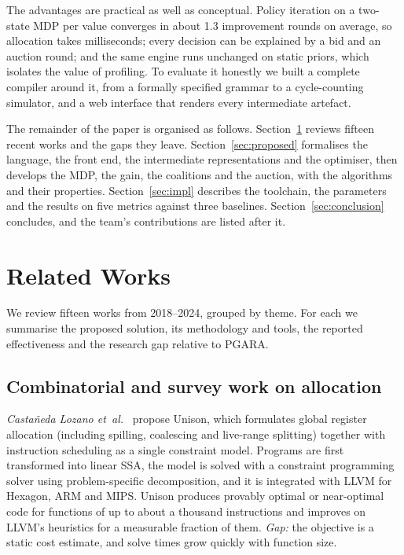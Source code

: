 \documentclass[conference]{IEEEtran}
\newcommand{\MG}{PGARA}
\begin{document}
The advantages are practical as well as conceptual. Policy iteration on
a two-state MDP per value converges in about 1.3 improvement rounds on
average, so allocation takes milliseconds; every decision can be
explained by a bid and an auction round; and the same engine runs
unchanged on static priors, which isolates the value of profiling.
To evaluate it honestly we built a complete compiler around it, from a
formally specified grammar to a cycle-counting simulator, and a web
interface that renders every intermediate artefact.

The remainder of the paper is organised as follows.
Section~\ref{sec:related} reviews fifteen recent works and the gaps they
leave. Section~\ref{sec:proposed} formalises the language, the front
end, the intermediate representations and the optimiser, then develops
the MDP, the gain, the coalitions and the auction, with the algorithms
and their properties. Section~\ref{sec:impl} describes the toolchain,
the parameters and the results on five metrics against three baselines.
Section~\ref{sec:conclusion} concludes, and the team's contributions are
listed after it.

\section{Related Works}
\label{sec:related}

We review fifteen works from 2018--2024, grouped by theme. For each we
summarise the proposed solution, its methodology and tools, the reported
effectiveness and the research gap relative to \MG.

\subsection{Combinatorial and survey work on allocation}

\textit{Castañeda Lozano et~al.}~\cite{lozano2019toplas} propose Unison,
which formulates global register allocation (including spilling,
coalescing and live-range splitting) together with instruction
scheduling as a single constraint model. Programs are first transformed
into linear SSA, the model is solved with a constraint programming
solver using problem-specific decomposition, and it is integrated with
LLVM for Hexagon, ARM and MIPS. Unison produces provably optimal or
near-optimal code for functions of up to about a thousand instructions
and improves on LLVM's heuristics for a measurable fraction of them.
\textit{Gap:} the objective is a static cost estimate, and solve times
grow quickly with function size.
\end{document}
